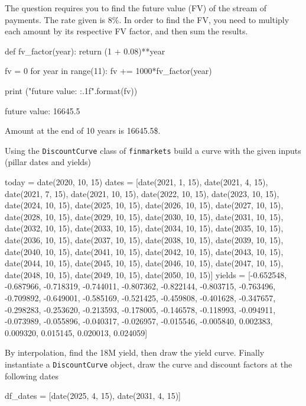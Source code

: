 \cprotEnv\begin{solution}
The question requires you to find the future value (FV) of the stream of payments. The rate given is 8\%.
In order to find the FV, you need to multiply each amount by its respective FV factor, and then sum the results.
	
\begin{ipython}
def fv_factor(year):
    return (1 + 0.08)**year
		
fv = 0
for year in range(11):
    fv += 1000*fv_factor(year)
		
print ("future value: {:.1f}".format(fv))
\end{ipython}
\begin{ioutput}
future value: 16645.5
\end{ioutput}
Amount at the end of 10 years is 16645.5\$.
\end{solution}

\cprotEnv\begin{question}
\label{ex:yield_discount}
Using the \texttt{DiscountCurve} class of \texttt{finmarkets} build a curve with the given inputs (pillar dates and yields)

\begin{ipython}
today = date(2020, 10, 15)
dates = [date(2021, 1, 15), date(2021, 4, 15), date(2021, 7, 15),
         date(2021, 10, 15), date(2022, 10, 15), date(2023, 10, 15),
         date(2024, 10, 15), date(2025, 10, 15), date(2026, 10, 15),
         date(2027, 10, 15), date(2028, 10, 15), date(2029, 10, 15),
         date(2030, 10, 15), date(2031, 10, 15), date(2032, 10, 15),
         date(2033, 10, 15), date(2034, 10, 15), date(2035, 10, 15),
         date(2036, 10, 15), date(2037, 10, 15), date(2038, 10, 15),
         date(2039, 10, 15), date(2040, 10, 15), date(2041, 10, 15),
         date(2042, 10, 15), date(2043, 10, 15), date(2044, 10, 15),
         date(2045, 10, 15), date(2046, 10, 15), date(2047, 10, 15),
         date(2048, 10, 15), date(2049, 10, 15), date(2050, 10, 15)]
yields = [-0.652548, -0.687966, -0.718319, -0.744011, -0.807362,
          -0.822144, -0.803715, -0.763496, -0.709892, -0.649001,
          -0.585169, -0.521425, -0.459808, -0.401628, -0.347657,
          -0.298283, -0.253620, -0.213593, -0.178005, -0.146578,
          -0.118993, -0.094911, -0.073989, -0.055896, -0.040317,
          -0.026957, -0.015546, -0.005840,  0.002383,  0.009320,
           0.015145,  0.020013,  0.024059]
\end{ipython}
\noindent
By interpolation, find the 18M yield, then draw the yield curve. Finally instantiate a \texttt{DiscountCurve} object, draw the curve and discount factors at the following dates
\begin{ipython}
df_dates = [date(2025, 4, 15), date(2031, 4, 15)]
\end{ipython}
\end{question}

